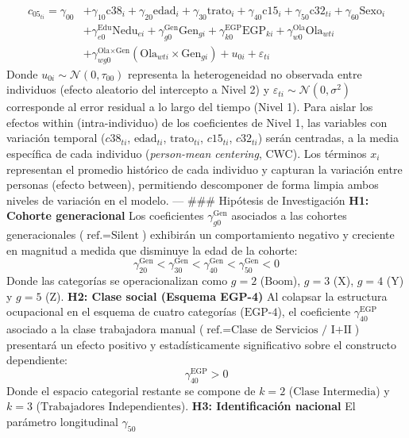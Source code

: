 \documentclass[
  spanish,
  a4paper,
  oneside]{scrbook}
\begin{document}
\[
\begin{aligned}
c_{05_{ti}} = \gamma_{00} 
&+ \gamma_{10}\text{c38}_{i} + \gamma_{20}\text{edad}_{i} + \gamma_{30}\text{trato}_{i} + \gamma_{40}\text{c15}_{i} + \gamma_{50}\text{c32}_{ti} + \gamma_{60}\text{Sexo}_{i} \\
&+ \gamma^{\text{Edu}}_{e0}\text{Nedu}_{ei} + \gamma^{\text{Gen}}_{g0}\text{Gen}_{gi} + \gamma^{\text{EGP}}_{k0}\text{EGP}_{ki} + \gamma^{\text{Ola}}_{w0}\text{Ola}_{wti} \\
&+ \gamma^{\text{Ola}\times\text{Gen}}_{wg0} (\text{Ola}_{wti} \times \text{Gen}_{gi}) + u_{0i} + \varepsilon_{ti}
\end{aligned}
\] Donde \(u_{0i} \sim \mathcal{N}(0, \tau_{00})\) representa la
heterogeneidad no observada entre individuos (efecto aleatorio del
intercepto a Nivel 2) y
\(\varepsilon_{ti} \sim \mathcal{N}(0, \sigma^2)\) corresponde al error
residual a lo largo del tiempo (Nivel 1). Para aislar los efectos within
(intra-individuo) de los coeficientes de Nivel 1, las variables con
variación temporal (\(c38_{ti}\), \(\text{edad}_{ti}\),
\(\text{trato}_{ti}\), \(c15_{ti}\), \(c32_{ti}\)) serán centradas, a la
media específica de cada individuo (\textit{person-mean centering},
CWC). Los términos \(x_{i}\) representan el promedio histórico de cada
individuo y capturan la variación entre personas (efecto between),
permitiendo descomponer de forma limpia ambos niveles de variación en el
modelo. --- \#\#\# Hipótesis de Investigación \textbf{H1: Cohorte
generacional} Los coeficientes \(\gamma^{\text{Gen}}_{g0}\) asociados a
las cohortes generacionales (\(\text{ref.} = \text{Silent}\)) exhibirán
un comportamiento negativo y creciente en magnitud a medida que
disminuye la edad de la cohorte:
\[\gamma^{\text{Gen}}_{20} < \gamma^{\text{Gen}}_{30} < \gamma^{\text{Gen}}_{40} < \gamma^{\text{Gen}}_{50} < 0\]
Donde las categorías se operacionalizan como \(g=2\) (\(\text{Boom}\)),
\(g=3\) (\(\text{X}\)), \(g=4\) (\(\text{Y}\)) y \(g=5\) (\(\text{Z}\)).
\textbf{H2: Clase social (Esquema EGP-4)} Al colapsar la estructura
ocupacional en el esquema de cuatro categorías (\(\text{EGP-4}\)), el
coeficiente \(\gamma^{\text{EGP}}_{40}\) asociado a la clase trabajadora
manual (\(\text{ref.} = \text{Clase de Servicios / I+II}\)) presentará
un efecto positivo y estadísticamente significativo sobre el constructo
dependiente: \[\gamma^{\text{EGP}}_{40} > 0\] Donde el espacio
categorial restante se compone de \(k=2\) (\(\text{Clase Intermedia}\))
y \(k=3\) (\(\text{Trabajadores Independientes}\)). \textbf{H3:
Identificación nacional} El parámetro longitudinal \(\gamma_{50}\)
\end{document}
